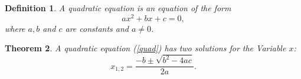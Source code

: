 \documentclass{article}
\newtheorem{thm}{Theorem}
\newtheorem{dfn}[thm]{Definition}
\begin{document}
\begin{dfn}
  A quadratic equation is an equation of the form
  \begin{equation}
    \label{quad}
    ax^2 + bx + c = 0,
  \end{equation}
  where \( a, b \) and \( c \) are constants and \( a \neq 0 \).
\end{dfn}
\begin{thm}
  A quadratic equation (\ref{quad}) has two solutions for the
  Variable \( x \):
  \begin{equation}
    \label{root}
    x_{1,2} = \frac{-b \pm \sqrt{b^2-4ac}}{2a}.
  \end{equation}
\end{thm}
\end{document}
